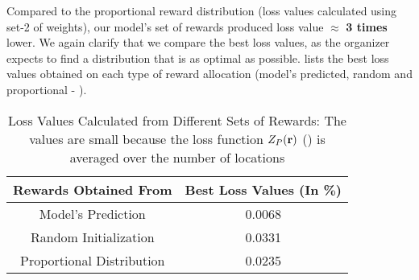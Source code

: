 Compared to the proportional reward distribution (loss values calculated using set-2 of weights), our model's set of rewards produced loss value $\approx$ \textbf{3 times} lower. We again clarify that we compare the best loss values, as the organizer expects to find a distribution that is as optimal as possible.   lists the best loss values obtained on each type of reward allocation (model's predicted, random and proportional - ).
\begin{table}[!htbp]
    \centering
    \caption[Loss Values Calculated from Different Sets of Rewards]{Loss Values Calculated from Different Sets of Rewards: The values are small because the loss function $Z_P(\mathbf{r})$ () is averaged over the number of locations}
    \label{tab:Loss Values Calculated from Different Sets of Rewards}
    \begin{tabular}{|c|c|}
        \hline
        \textbf{Rewards Obtained From} & \textbf{Best Loss Values (In \%)}\\
        \hline
        Model's Prediction & 0.0068\\
        Random Initialization & 0.0331\\
        Proportional Distribution & 0.0235\\
        \hline
    \end{tabular}
\end{table}

